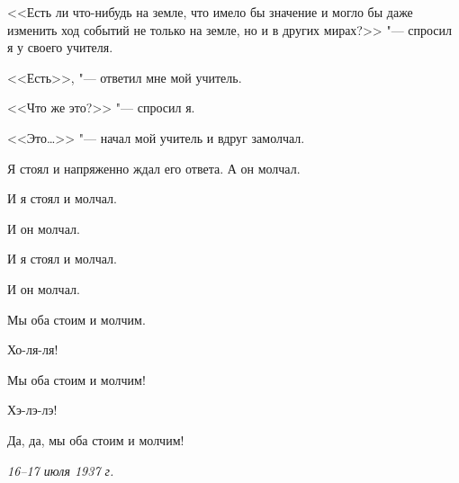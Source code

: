 <<Есть ли что-нибудь на земле, что имело бы значение и могло бы даже изменить ход событий не только на земле, но и в других мирах?>> "--- спросил я у своего учителя.

<<Есть>>, "--- ответил мне мой учитель.

<<Что же это?>> "--- спросил я.

<<Это\dots>> "--- начал мой учитель и вдруг замолчал.

Я стоял и напряженно ждал его ответа. А он молчал.

И я стоял и молчал.

И он молчал.

И я стоял и молчал.

И он молчал.

Мы оба стоим и молчим.

Хо-ля-ля!

Мы оба стоим и молчим!

Хэ-лэ-лэ!

Да, да, мы оба стоим и молчим!

\medskip
\noindent\textit{16--17 июля 1937 г.}